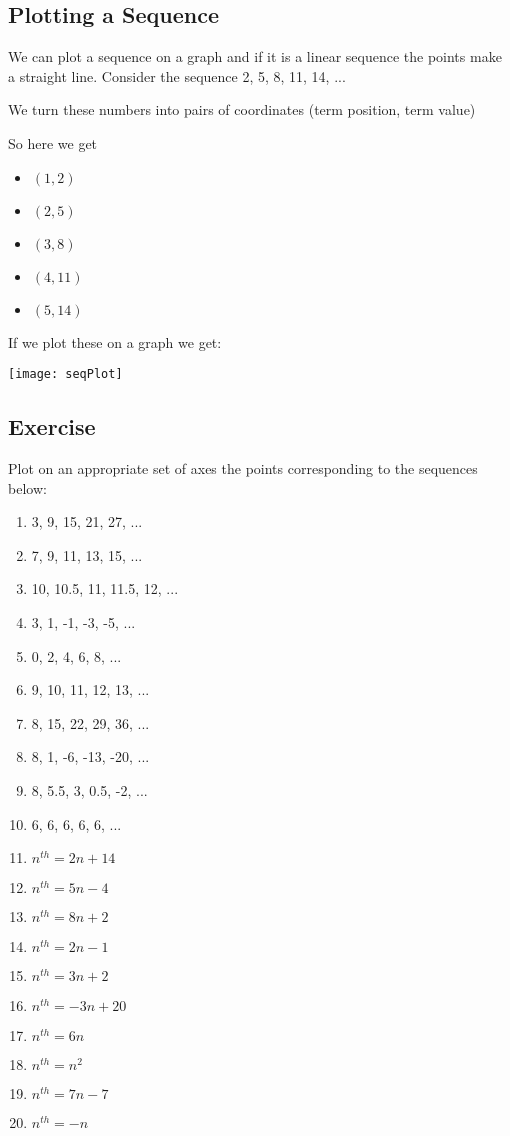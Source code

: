 \subsection{Plotting a Sequence}
We can plot a sequence on a graph and if it is a linear sequence the points make a straight line.  Consider the sequence 2, 5, 8, 11, 14, ...

\bigskip

We turn these numbers into pairs of coordinates (term position, term value)

\bigskip

So here we get

\begin{itemize}
	\item $(1,2)$
	\item $(2,5)$
	\item $(3,8)$
	\item $(4,11)$
	\item $(5,14)$
\end{itemize}

If we plot these on a graph we get:

\begin{center}
	\texttt{[image: seqPlot]}
\end{center}

\subsection{Exercise}
Plot on an appropriate set of axes the points corresponding to the sequences below:
\begin{enumerate}
	\item 3, 9, 15, 21, 27, ...
	\item 7, 9, 11, 13, 15, ...
	\item 10, 10.5, 11, 11.5, 12, ...
	\item 3, 1, -1, -3, -5, ...
	\item 0, 2, 4, 6, 8, ...
	\item 9, 10, 11, 12, 13, ...
	\item 8, 15, 22, 29, 36, ...
	\item 8, 1, -6, -13, -20, ...
	\item 8, 5.5, 3, 0.5, -2, ...
	\item 6, 6, 6, 6, 6, ...
	\item $n^{th}=2n+14$
	\item $n^{th}=5n-4$
	\item $n^{th}=8n+2$
	\item $n^{th}=2n-1$
	\item $n^{th}=3n+2$
	\item $n^{th}=-3n+20$
	\item $n^{th}=6n$
	\item $n^{th}=n^2$
	\item $n^{th}=7n-7$
	\item $n^{th}=-n$
\end{enumerate}

